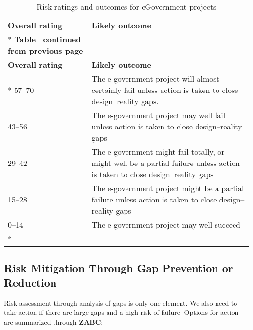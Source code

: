 \begin{longtable}[c]{@{}lp{9cm}@{}}
	\caption{Risk ratings and outcomes for eGovernment projects}
	\label{tab:risk-ratings}\\
	\toprule
	\textbf{Overall rating} & \textbf{Likely outcome}                                                                                  \\* \midrule
	\endfirsthead
	\multicolumn{2}{c}%
	{{\bfseries Table \thetable\ continued from previous page}} \\
	\toprule
	\textbf{Overall rating} & \textbf{Likely outcome}                                                                                  \\* \midrule
	\endhead
	\bottomrule
	\endfoot
	\endlastfoot
	57–70                   & The e-government project will almost certainly fail unless action is taken to close design–reality gaps. \\
	43–56                   & The e-government project may well fail unless action is taken to close design–reality gaps               \\
	29–42 & The e-government might fail totally, or might well be a partial failure unless action is taken to close design–reality gaps \\
	15–28                   & The e-government project might be a partial failure unless action is taken to close design–reality gaps  \\
	0–14                    & The e-government project may well succeed                                                                \\* \bottomrule
\end{longtable}

\subsection[Risk Mitigation]{Risk Mitigation Through Gap Prevention or Reduction}

Risk assessment through analysis of gaps is
only one element. We also need to take
action if there are large gaps and a high risk
of failure. Options for action are summarized through \textbf{ZABC}:

